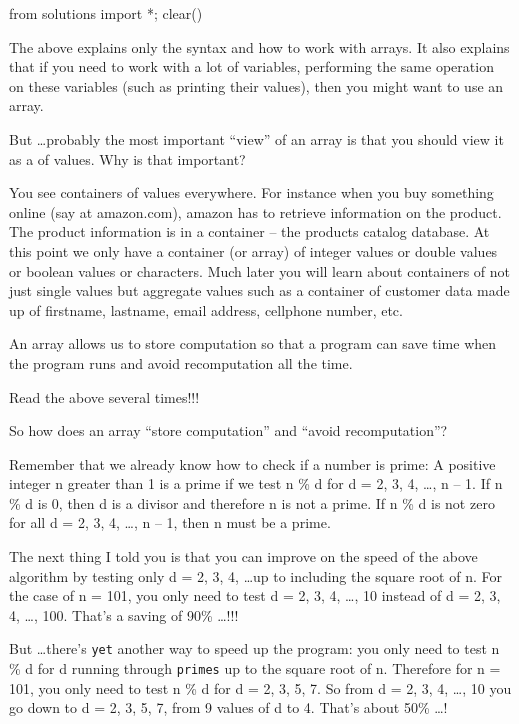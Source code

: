 \begin{python0}
from solutions import *; clear()
\end{python0}

The above explains only the syntax and how to work with arrays. It also explains that if you need to work with a lot of variables, performing the same operation on these variables (such as printing their values), then you might want to use an array.

But \ldots probably the most important ``view'' of an array is that you should view it as a  of values. Why is that important?

You see containers of values everywhere. For instance when you buy something online (say at amazon.com), amazon has to retrieve information on the product. The product information is in a container -- the products catalog database. At this point we only have a container (or array) of integer values or double values or boolean values or characters. Much later you will learn about containers of not just single values but aggregate values such as a container of customer data made up of firstname, lastname, email address, cellphone number, etc.

An array allows us to store computation so that a program can save time when the program runs and avoid recomputation all the time.

Read the above several times!!!

So how does an array ``store computation'' and ``avoid recomputation''?

Remember that we already know how to check if a number is prime: A positive integer n greater than 1 is a prime if we test n \% d for d = 2, 3, 4, \ldots, n -- 1. If n \% d is 0, then d is a divisor and therefore n is not a prime. If n \% d is not zero for all d = 2, 3, 4, \ldots, n -- 1, then n must be a prime.

The next thing I told you is that you can improve on the speed of the above algorithm by testing only d = 2, 3, 4, \ldots up to including the square root of n. For the case of n = 101, you only need to test d = 2, 3, 4, \ldots, 10 instead of d = 2, 3, 4, \ldots, 100. That's a saving of 90\% \ldots !!!

But \ldots there's \texttt{yet} another way to speed up the program: you only need to test n \% d for d running through \texttt{primes} up to the square root of n. Therefore for n = 101, you only need to test n \% d for d = 2, 3, 5, 7. So from d = 2, 3, 4, \ldots, 10 you go down to d = 2, 3, 5, 7, from 9 values of d to 4. That's about 50\% \ldots !


